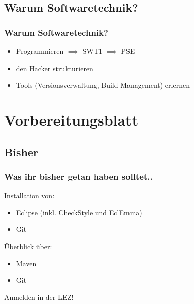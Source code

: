 \documentclass[18pt]{beamer}
\begin{document}
	\subsection{Warum Softwaretechnik?}
		\begin{frame}
			\frametitle{Warum Softwaretechnik?}
			\begin{itemize}
				\item Programmieren $\implies$ SWT1 $\implies$ PSE \pause
				\item den Hacker strukturieren \pause
				\item Tools (Versionsverwaltung, Build-Management) erlernen
			\end{itemize}
		\end{frame}
		
\section{Vorbereitungsblatt}
	\subsection{Bisher}
	\begin{frame}
		\frametitle{Was ihr bisher getan haben solltet..}
		Installation von:
		\begin{itemize}
			\item Eclipse (inkl. CheckStyle und EclEmma)
			\item Git
		\end{itemize}
		Überblick über:
		\begin{itemize}
			\item Maven
			\item Git
		\end{itemize}
		Anmelden in der LEZ!
	\end{frame}


		
\end{document}
